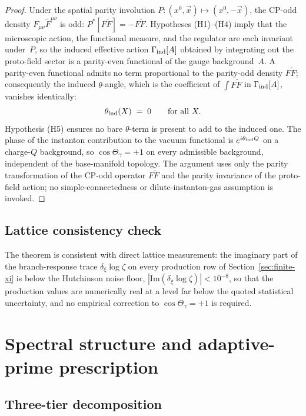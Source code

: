\documentclass[a4paper,11pt]{article}
\theoremstyle{definition}
\begin{document}
\begin{proof}
Under the spatial parity involution
$P: (x^0,\vec{x}) \mapsto (x^0,-\vec{x})$, the CP-odd density
$F_{\mu\nu}\tilde{F}^{\mu\nu}$ is odd:
$P^*[F\tilde F] = -F\tilde F$. Hypotheses (H1)--(H4) imply that the microscopic action, the
functional measure, and the regulator are each invariant under~$P$,
so the induced effective action $\Gamma_{\rm ind}[A]$ obtained by
integrating out the proto-field sector is a parity-even functional
of the gauge background~$A$. A
parity-even functional admits no term proportional to the parity-odd
density $F\tilde F$; consequently the induced $\theta$-angle, which
is the coefficient of $\int F\tilde F$ in $\Gamma_{\rm ind}[A]$,
vanishes identically:
\[
\theta_{\rm ind}(X) \;=\; 0 \qquad \text{for all } X.
\]
Hypothesis (H5) ensures no bare $\theta$-term is present to add to
the induced one. The phase of the instanton contribution to the
vacuum functional is $e^{i\theta_{\rm ind} Q}$ on a charge-$Q$
background, so $\cos\Theta_\gamma = +1$ on every admissible
background, independent of the base-manifold topology. The argument
uses only the parity transformation of the CP-odd operator
$F\tilde F$ and the parity invariance of the proto-field action; no
simple-connectedness or dilute-instanton-gas assumption is invoked.
\end{proof}

\subsection{Lattice consistency check}
\label{subsec:phase-consistency}

The theorem is consistent with direct lattice measurement: the
imaginary part of the branch-response trace $\delta_\xi \log\zeta$
on every production row of Section~\ref{sec:finite-xi} is below the
Hutchinson noise floor,
$|\mathrm{Im}(\delta_\xi \log\zeta)| < 10^{-8}$, so that the
production values are numerically real at a level far below the
quoted statistical uncertainty, and no empirical correction to
$\cos\Theta_\gamma = +1$ is required.


\section{Spectral structure and adaptive-prime prescription}
\label{sec:spectral}

\subsection{Three-tier decomposition}
\label{subsec:three-tier}
\end{document}
